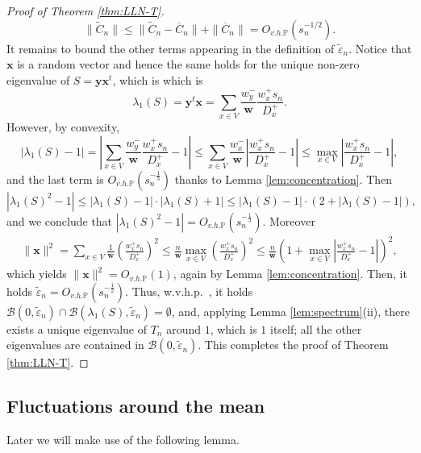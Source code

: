 \documentclass[11pt,oneside]{amsart}
\theoremstyle{plain}
\numberwithin{equation}{section}
\newcommand{\wetahp}{{w.v.h.p.~}}
\newcommand{\eps}{\varepsilon}
\newcommand{\p}{\mathbb{P}}
\newcommand{\overlinecentered}{{\overline C_n}}
\newcommand{\tildecentered}{{\widetilde C_n}}
\newcommand{\w}{\boldsymbol{w}}
\newcommand{\xx}{\boldsymbol{x}}
\newcommand{\yy}{\boldsymbol{y}}
\newcommand{\scaling}{s_n}
\newcommand{\Ohp}{O_{v.h.\p}}
\begin{document}
\begin{proof}[Proof of Theorem \ref{thm:LLN-T}]
$$\|\tildecentered\|\le \|\tildecentered -\overlinecentered\|+\|\overlinecentered\|=\Ohp(\scaling^{-1/2}).$$
It remains to bound the other terms appearing in the definition of $\tilde \eps_n$.
Notice that $\xx$ is a random vector and hence the same holds for the unique non-zero eigenvalue of $S=\yy\xx^t$, which is
which is $$\lambda_1(S)=\yy^t\xx=\sum_{x \in V}\frac{w_y^-}{\w}\frac{w_x^+\scaling}{D_x^+}.$$ 
However, by convexity,
\begin{equation}
    |\lambda_1(S)-1|=\left|\sum_{x \in V}\frac{w_y^-}{\w}\frac{w_x^+\scaling}{D_x^+}-1\right|
    \le\sum_{x \in V}\frac{w_x^-}{\w}\left|\frac{w_x^+\scaling}{D_x^+}-1\right|
    \le \max_{x \in V}\left|\frac{w_x^+\scaling}{D_x^+}-1\right|,
\end{equation}
and the last term is $\Ohp(\scaling^{-\frac13})$ thanks to Lemma \ref{lem:concentration}. Then
\begin{equation}\label{eq:bound}
    |\lambda_1(S)^2-1|\le |\lambda_1(S)-1|\cdot|\lambda_1(S)+1|\le |\lambda_1(S)-1|\cdot(2+|\lambda_1(S)-1|),
\end{equation}
and we conclude that $|\lambda_1(S)^2-1|=\Ohp(\scaling^{-\frac13})$.
Moreover
\begin{equation}
\begin{split}
    \|\xx\|^2=\sum_{x \in V} \frac{1}{\w}\left(\frac{w_x^+\scaling}{D_x^+}\right)^2
     \le \frac{n}{\w}\max_{x \in V}\left(\frac{w_x^+\scaling}{D_x^+}\right)^2
     \le \frac{n}{\w}\left(1+\max_{x \in V}\left|\frac{w_x^+\scaling}{D_x^+}-1\right|\right)^2,
\end{split}
\end{equation}
which yields $\|\xx\|^2=\Ohp(1)$, again by Lemma \ref{lem:concentration}.
Then, it holds $ \tilde \eps_n =\Ohp(\scaling^{-\frac12})$.
Thus, \wetahp, it holds $\mathcal{B}(0, \tilde \eps_n) \cap \mathcal{B}(\lambda_1(S), \tilde \eps_n) = \emptyset$, and, applying Lemma \ref{lem:spectrum}(ii), there exists a unique eigenvalue of $T_n$ around $1$, which is $1$ itself; all the other eigenvalues are contained in $\mathcal{B}(0,\tilde  \eps_n)$. This completes the proof of Theorem \ref{thm:LLN-T}.
\end{proof}

\subsection{Fluctuations around the mean}

\label{subsec:sp-fluctuations}

Later we will make use of the following lemma.
\end{document}
